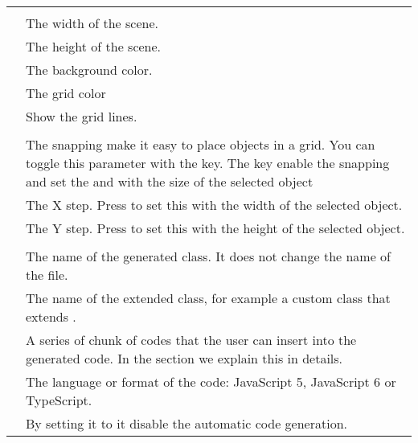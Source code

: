\documentclass[letterpaper,10pt,english]{sphinxmanual}
\begin{document}
\begin{savenotes}\sphinxattablestart
\centering
\begin{tabulary}{\linewidth}[t]{|T|T|}
\hline
{}\relax &\relax \\
\hline
{}
&\\
\hline
{}
&
The width of the scene.
\\
\hline
{}
&
The height of the scene.
\\
\hline
{}
&
The background color.
\\
\hline
{}
&
The grid color
\\
\hline
{}
&
Show the grid lines.
\\
\hline
{}
&\\
\hline
{}
&
The snapping make it easy to place objects in a grid.
You can toggle this parameter with the  key.
The  key enable the snapping and set the
 and  with the size of
the selected object
\\
\hline
{}
&
The X step. Press  to set this with the width
of the selected object.
\\
\hline
{}
&
The Y step. Press  to set this with the height
of the selected object.
\\
\hline
{}
&\\
\hline
{}
&
The name of the generated class. It does not change
the name of the file.
\\
\hline
{}
&
The name of the extended class, for example a custom  class that extends .
\\
\hline
{}
&
A series of chunk of codes that the user can insert into the generated code. In the {\hyperref[\detokenize{canvas:user-code}]{}} section we explain this in details.
\\
\hline
{}
&
The language or format of the code: JavaScript 5, JavaScript 6 or TypeScript.
\\
\hline
{}
&
By setting it to  it disable the automatic code generation.
\\
\hline
\end{tabulary}
\par
\sphinxattableend\end{savenotes}
\end{document}
